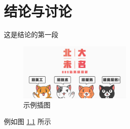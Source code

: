 
\chapter{结论与讨论}
这是结论的第一段
\par



\begin{figure}[htbp!]
    \centering
    \includegraphics[width = 0.5\textwidth,natwidth=610,natheight=642]{chap/index_MKoueo.jpg}
    \caption{示例插图}\label{fig:example}
\end{figure}

\par
例如图 \ref{fig:example} 所示

